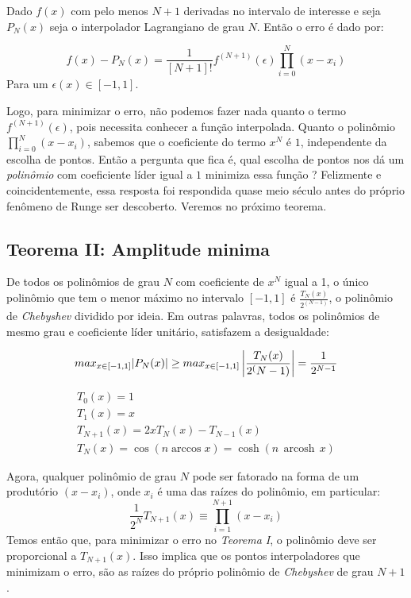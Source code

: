  Dado $f(x)$  com pelo menos $N+1$ derivadas no intervalo de interesse e seja $P_N(x)$ seja o interpolador Lagrangiano de grau $N$. Então o erro é dado por:
 
 \begin{equation}
 f(x) - P_N(x) = \frac{1}{[N+1]!}f^{(N+1)}(\epsilon)\prod^{N}_{i = 0} (x - x_i)
 \end{equation}
 Para um $\epsilon(x) \in [-1,1]$.
 
 Logo, para minimizar o erro, não podemos fazer nada quanto o termo $f^(N+1)(\epsilon)$, pois necessita conhecer a função interpolada. Quanto o polinômio $\prod^{N}_{i = 0} (x - x_i)$, sabemos que o coeficiente do termo $x^N$ é $1$, independente da escolha de pontos. Então a pergunta que fica é, qual escolha de pontos nos dá um \emph{polinômio} com coeficiente líder igual a $1$ minimiza essa função ? Felizmente e coincidentemente, essa resposta foi respondida quase meio século antes do próprio fenômeno de Runge ser descoberto. Veremos no próximo teorema.

 
\subsection{Teorema II: Amplitude minima}
 De todos os polinômios de grau $N$ com coeficiente de $x^N$ igual a 1, o único polinômio que tem o menor máximo no intervalo $[-1,1]$ é $\frac{T_N(x)}{2^(N-1)}$, o polinômio de \emph{Chebyshev} dividido por ideia. Em outras palavras, todos os polinômios de mesmo grau e coeficiente líder unitário, satisfazem a desigualdade:

\begin{equation}
	max_{x \in [-1,1]}|P_N(x)| \geq  max_{x \in [-1,1]} \left |\frac{T_N(x)}{2^(N-1)}  \right |  = \frac{1}{2^{N-1}}\\
\end{equation}

\begin{align}
    T_0(x) = 1\\
    T_1(x) = x\\
    T_{N+1}(x) = 2xT_N(x) - T_{N-1}(x)\\
    T_{N}(x)=\cos(n \arccos x)=\cosh(n\,\operatorname{arcosh}\,x)
\end{align}

 Agora, qualquer polinômio de grau $N$ pode ser fatorado na forma de um produtório  $(x - x_i)$, onde $x_i$ é uma das raízes do polinômio, em particular:
 \begin{equation}
 \frac{1}{2^N}T_{N+1}(x) \equiv \prod_{i = 1}^{N+1} (x-x_i)
 \end{equation}
 Temos então que, para minimizar o erro no \emph{Teorema I}, o polinômio deve ser proporcional a $T_{N+1}(x)$. Isso implica que  os pontos interpoladores que minimizam o erro, são as raízes do próprio polinômio de \emph{Chebyshev} de grau $N+1$.
 
